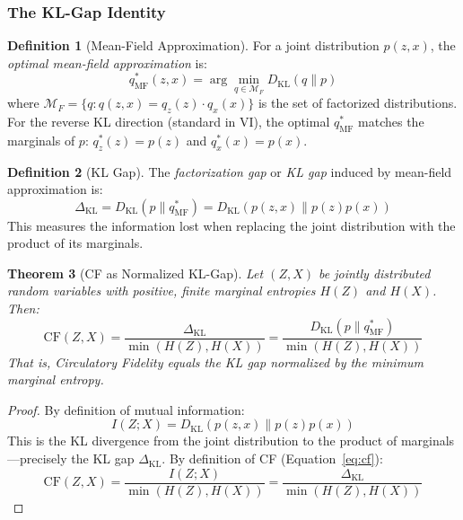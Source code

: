 \documentclass[10pt]{article} %
\theoremstyle{plain}
\newtheorem{theorem}{Theorem}[section]
\theoremstyle{definition}
\newtheorem{definition}[theorem]{Definition}
\newcommand{\CF}{\mathrm{CF}}
\begin{document}
\subsubsection{The KL-Gap Identity}

\begin{definition}[Mean-Field Approximation]
For a joint distribution $p(z, x)$, the \emph{optimal mean-field approximation} is:
\begin{equation}
q_{\text{MF}}^*(z, x) = \arg\min_{q \in \mathcal{M}_F} D_{\text{KL}}(q \| p)
\end{equation}
where $\mathcal{M}_F = \{q : q(z, x) = q_z(z) \cdot q_x(x)\}$ is the set of factorized distributions. For the reverse KL direction (standard in VI), the optimal $q_{\text{MF}}^*$ matches the marginals of $p$: $q_z^*(z) = p(z)$ and $q_x^*(x) = p(x)$.
\end{definition}

\begin{definition}[KL Gap]
The \emph{factorization gap} or \emph{KL gap} induced by mean-field approximation is:
\begin{equation}
\Delta_{\text{KL}} = D_{\text{KL}}(p \| q_{\text{MF}}^*) = D_{\text{KL}}(p(z,x) \| p(z)p(x))
\end{equation}
This measures the information lost when replacing the joint distribution with the product of its marginals.
\end{definition}

\begin{theorem}[CF as Normalized KL-Gap]
\label{thm:kl-gap}
Let $(Z, X)$ be jointly distributed random variables with positive, finite marginal entropies $H(Z)$ and $H(X)$. Then:
\begin{equation}
\CF(Z, X) = \frac{\Delta_{\text{KL}}}{\min(H(Z), H(X))} = \frac{D_{\text{KL}}(p \| q_{\text{MF}}^*)}{\min(H(Z), H(X))}
\end{equation}
That is, Circulatory Fidelity equals the KL gap normalized by the minimum marginal entropy.
\end{theorem}

\begin{proof}
By definition of mutual information:
\begin{equation}
I(Z; X) = D_{\text{KL}}(p(z,x) \| p(z)p(x))
\end{equation}
This is the KL divergence from the joint distribution to the product of marginals---precisely the KL gap $\Delta_{\text{KL}}$. By definition of CF (Equation~\ref{eq:cf}):
\begin{equation}
\CF(Z, X) = \frac{I(Z; X)}{\min(H(Z), H(X))} = \frac{\Delta_{\text{KL}}}{\min(H(Z), H(X))}
\end{equation}
\end{proof}
\end{document}
